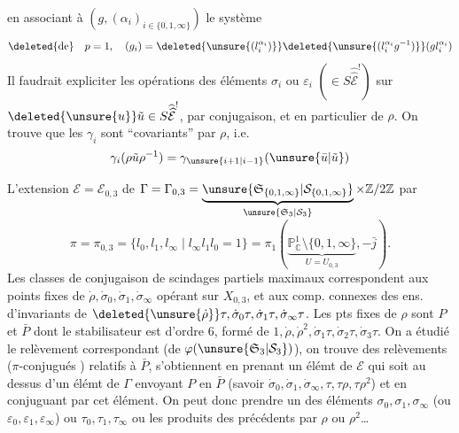 en associant à $(g,(\alpha_i)_{i\in\{0,1,\infty\}})$ le système
\[
\deleted{\text{de}}\quad p=1,\quad(g_i)=\deleted{\unsure{(l_i^{\alpha_i})}}\deleted{\unsure{(l_i^{\alpha_i}g^{-1})}}(gl_i^{\alpha_i})
\]
Il faudrait expliciter les opérations des éléments $\sigma_i$ ou $\varepsilon_i$  $(\in S\widehat{\widehat{\mathcal E}}^!)$ sur $\deleted{\unsure{u}}\tilde u\in S\widehat{\widehat{\mathcal E}}^!$, par  conjugaison, et en particulier de $\rho$. On trouve que  les $\gamma_i$ sont ``covariants'' par $\rho$, i.e.
\[
\gamma_i(\rho\tilde u\rho^{-1})=\gamma_{\unsure{i+1|i-1}}(\unsure{\bar u|\tilde u})
\]

L'extension $\mathcal E=\mathcal E_{0,3}$ de $\Gamma=\Gamma_{0,3}=\underbrace{\unsure{\mathfrak S_{\{0,1,\infty\}}|\mathcal S_{\{0,1,\infty\}}}}_{\unsure{\mathfrak S_3|\mathcal S_3}}\times\mathbb Z/2\mathbb Z$
par
\[
\pi=\pi_{0,3}=\{l_0,l_1,l_\infty\mid l_\infty l_1l_0=1\}=\pi_1(\underbrace{\mathbb P^1_{\mathbb C}\setminus\{0,1,\infty\}}_{U=U_{0,3}},-\bar j).
\]
Les classes de conjugaison  de scindages partiels maximaux correspondent aux points fixes de $\dot\rho,\dot\sigma_0,\dot\sigma_1,\dot\sigma_\infty$ opérant sur $X_{0,3}$, et  aux comp. connexes des ens. d'invariants de $\deleted{\unsure{\dot\rho}}\tau,\dot\sigma_0\tau,\dot\sigma_1\tau,\dot\sigma_\infty\tau$. Les pts fixes de $\rho$ sont $P$ et $\bar P$ dont le stabilisateur est d'ordre $6$,  formé de $1,\dot\rho,\dot\rho^2,\dot\sigma_1\tau,\dot\sigma_2\tau,\dot\sigma_3\tau$. On a étudié le relèvement correspondant  (de $\varphi(\unsure{\mathfrak S_3|\mathcal S_3})$), on trouve des relèvements ($\pi$-conjugués ) relatifs à $\bar P$, s'obtiennent en  prenant un élémt de $\mathcal E$  qui soit au dessus d'un élémt de $\Gamma$ envoyant $P$ en $\bar P$ (savoir $\dot\sigma_0,\dot\sigma_1,\dot\sigma_\infty,\tau,\tau\rho,\tau\rho^2$) et en conjuguant par cet élément. On peut donc prendre  un des éléments $\sigma_0,\sigma_1,\sigma_\infty$ (ou $\varepsilon_0,\varepsilon_1,\varepsilon_\infty$) ou $\tau_0,\tau_1,\tau_\infty$ ou les produits des précédents par \deleted{\unsure{$\tau$}} $\rho$ ou $\rho^2$\ldots

